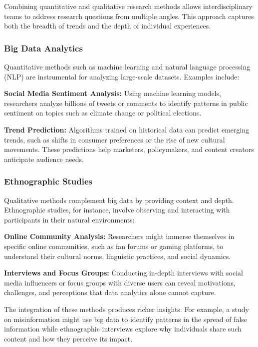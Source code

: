 \documentclass[
]{book}
\begin{document}
Combining quantitative and qualitative research methods allows interdisciplinary teams to address research questions from multiple angles. This approach captures both the breadth of trends and the depth of individual experiences.

\subsubsection*{Big Data Analytics}\label{big-data-analytics}

Quantitative methods such as machine learning and natural language processing (NLP) are instrumental for analyzing large-scale datasets. Examples include:

\textbf{Social Media Sentiment Analysis:} Using machine learning models, researchers analyze billions of tweets or comments to identify patterns in public sentiment on topics such as climate change or political elections.

\textbf{Trend Prediction:} Algorithms trained on historical data can predict emerging trends, such as shifts in consumer preferences or the rise of new cultural movements. These predictions help marketers, policymakers, and content creators anticipate audience needs.

\subsubsection*{Ethnographic Studies}\label{ethnographic-studies}

Qualitative methods complement big data by providing context and depth. Ethnographic studies, for instance, involve observing and interacting with participants in their natural environments:

\textbf{Online Community Analysis:} Researchers might immerse themselves in specific online communities, such as fan forums or gaming platforms, to understand their cultural norms, linguistic practices, and social dynamics.

\textbf{Interviews and Focus Groups:} Conducting in-depth interviews with social media influencers or focus groups with diverse users can reveal motivations, challenges, and perceptions that data analytics alone cannot capture.

The integration of these methods produces richer insights. For example, a study on misinformation might use big data to identify patterns in the spread of false information while ethnographic interviews explore why individuals share such content and how they perceive its impact.
\end{document}
